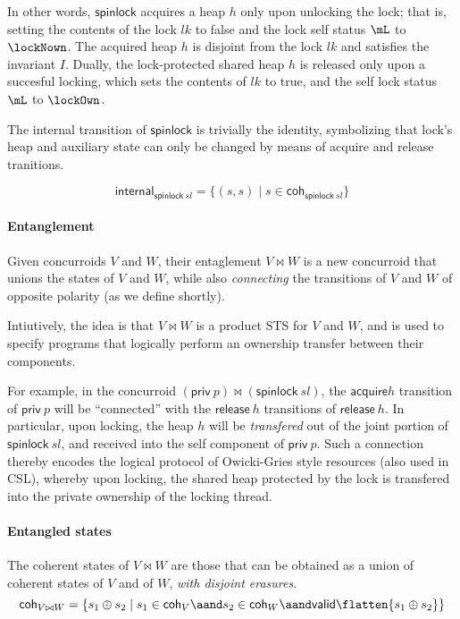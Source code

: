 In other words, $\mathsf{spinlock}$ acquires a heap $h$ only upon
unlocking the lock; that is, setting the contents of the lock $lk$ to
false and the lock self status $\mL$ to $\lockNown$. The acquired heap
$h$ is disjoint from the lock $lk$ and satisfies the invariant
$I$. Dually, the lock-protected shared heap $h$ is released only upon
a succesful locking, which sets the contents of $lk$ to true, and the
self lock status $\mL$ to $\lockOwn$.

The internal transition of $\mathsf{spinlock}$ is trivially the
identity, symbolizing that lock's heap and auxiliary state can only be
changed by means of acquire and release tranitions.

\[
\mathsf{internal}_{\mathsf{spinlock}\ sl} = \{(s, s) \mid s \in \mathsf{coh}_{\mathsf{spinlock}\ sl}\}
\]

\paragraph{Entanglement}

Given concurroids $V$ and $W$, their entaglement $V \bowtie W$ is a
new concurroid that unions the states of $V$ and $W$, while also
\emph{connecting} the transitions of $V$ and $W$ of opposite polarity
(as we define shortly).

Intiutively, the idea is that $V \bowtie W$ is a product STS for $V$
and $W$, and is used to specify programs that logically perform an
ownership transfer between their components.

For example, in the concurroid $(\mathsf{priv}\ p) \bowtie
(\mathsf{spinlock}\ sl)$, the $\mathsf{acquire} h$ transition of
$\mathsf{priv}\ p$ will be ``connected'' with the
$\mathsf{release}\ h$ transitions of $\mathsf{release}\ h$.  In
particular, upon locking, the heap $h$ will be \emph{transfered} out
of the joint portion of $\mathsf{spinlock}\ sl$, and received into the
self component of $\mathsf{priv}\ p$. Such a connection thereby
encodes the logical protocol of Owicki-Gries style resources (also
used in CSL), whereby upon locking, the shared heap protected by the
lock is transfered into the private ownership of the locking thread.


\paragraph{Entangled states}

The coherent states of $V \bowtie W$ are those that can be obtained as
a union of coherent states of $V$ and of $W$, \emph{with disjoint
  erasures}.
\[
\mathsf{coh}_{V \bowtie W} = \{s_1 \oplus s_2 \mid 
s_1 \in \mathsf{coh}_V \aand s_2 \in \mathsf{coh}_W \aand \mathsf{valid} \flatten {s_1 \oplus s_2}\}
\]

